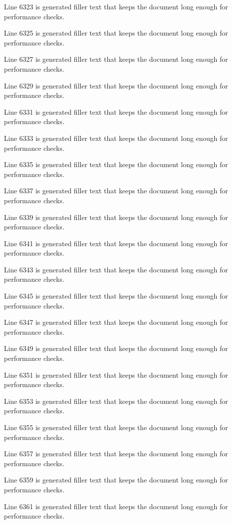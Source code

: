 Line 6323 is generated filler text that keeps the document long enough for performance checks.

Line 6325 is generated filler text that keeps the document long enough for performance checks.

Line 6327 is generated filler text that keeps the document long enough for performance checks.

Line 6329 is generated filler text that keeps the document long enough for performance checks.

Line 6331 is generated filler text that keeps the document long enough for performance checks.

Line 6333 is generated filler text that keeps the document long enough for performance checks.

Line 6335 is generated filler text that keeps the document long enough for performance checks.

Line 6337 is generated filler text that keeps the document long enough for performance checks.

Line 6339 is generated filler text that keeps the document long enough for performance checks.

Line 6341 is generated filler text that keeps the document long enough for performance checks.

Line 6343 is generated filler text that keeps the document long enough for performance checks.

Line 6345 is generated filler text that keeps the document long enough for performance checks.

Line 6347 is generated filler text that keeps the document long enough for performance checks.

Line 6349 is generated filler text that keeps the document long enough for performance checks.

Line 6351 is generated filler text that keeps the document long enough for performance checks.

Line 6353 is generated filler text that keeps the document long enough for performance checks.

Line 6355 is generated filler text that keeps the document long enough for performance checks.

Line 6357 is generated filler text that keeps the document long enough for performance checks.

Line 6359 is generated filler text that keeps the document long enough for performance checks.

Line 6361 is generated filler text that keeps the document long enough for performance checks.

